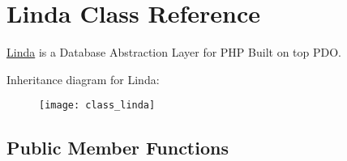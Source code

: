 \hypertarget{class_linda}{}\section{Linda Class Reference}
\label{class_linda}


\hyperlink{class_linda}{Linda} is a Database Abstraction Layer for P\+H\+P Built on top P\+D\+O.  


Inheritance diagram for Linda\+:\begin{figure}[H]
\begin{center}
\leavevmode
\texttt{[image: class\_linda]}
\end{center}
\end{figure}
\subsection*{Public Member Functions}
